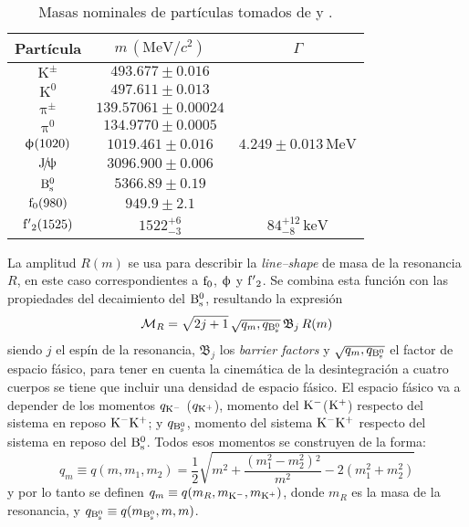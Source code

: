\begin{table}[H]
  \centering
  \begin{tabular}{ccc}
\toprule
Partícula & $m \, (\text{MeV}/c^2)$  & $\Gamma$ \\ \midrule
$\mathrm{K^{\pm}}$    & $ 493.677\pm0.016 $\\
$\mathrm{K^{0}}$      & $497.611\pm0.013$\\
$\uppi^{\pm}$         & $139.57061\pm0.00024$\\
$\uppi^{0}$           & $134.9770\pm0.0005$\\
$\upphi (1020)$         & $1019.461\pm0.016$  & $4.249\pm0.013 \, \text{MeV}$\\
$\mathrm{J}\!/\!\uppsi$               & $3096.900\pm0.006$  \\%
$\mathrm{B}{}_{\mathrm{s}}^{0}$                 & $5366.89\pm0.19$ \\ \midrule
$\mathrm{f}_0 (980)$        & $949.9\pm2.1$ \\
$\mathrm{f'}_2 (1525)$       & $1522_{-3}^{+6}$          & $84_{-8}^{+12} \, \text{keV}$\\
\bottomrule
  \end{tabular}
  \caption{Masas nominales de partículas tomados de \cite[primer bloque]{pdg2018} y \cite[segundo bloque]{Aaij:1664567}.} \label{tab_massPDG}
\end{table}
\color{norm}


\color{new}
La amplitud $R(m)$ se usa para describir la \emph{line--shape} de masa de la resonancia $R$, en este caso correspondientes a $\mathrm{f}_0$, $\upphi$ y $\mathrm{f'}_2$. Se combina esta función con las propiedades del decaimiento del $\mathrm{B}{}_{\mathrm{s}}^{0}$, resultando la expresión \cite{Aaij:1664567}  
\begin{equation}
  \mathcal{M}_R = \sqrt{2 j + 1}\, \sqrt{q_m,q_{\mathrm{B}{}_{\mathrm{s}}^{0}}} \,\mathfrak{B}_j \, R(m) \label{eq:masslineshape}
\end{equation}
siendo $j$ el espín de la resonancia, $\mathfrak{B}_j$ los \emph{barrier factors} y  $\sqrt{q_m,q_{\mathrm{B}{}_{\mathrm{s}}^{0}}}$ el factor de espacio fásico, para tener en cuenta la cinemática de la desintegración a cuatro cuerpos se tiene que incluir una densidad de espacio fásico.
%
%
%
%
%
\color{norm}
%
El espacio fásico va a depender de los momentos $q_{\mathrm{K}{}^{-}}$  ($q_{\mathrm{K}{}^{+}}$), momento del $\mathrm{K}{}^{-}$($\mathrm{K}{}^{+}$) respecto del sistema en reposo $\mathrm{K}{}^{-}\mathrm{K}{}^{+}$; y  $q_{\mathrm{B}{}_{\mathrm{s}}^{0}}$, momento del sistema $\mathrm{K}{}^{-}\mathrm{K}{}^{+}$ respecto del sistema en reposo del $\mathrm{B}{}_{\mathrm{s}}^{0}$. Todos esos momentos se construyen de la forma:
\begin{equation}
q_m \equiv q(m,m_1,m_2) = \frac{1}{2}  \sqrt{m^2+\frac{\left(m_1^2-m_2^2\right){}^2}{m^2}-2 \left(m_1^2+m_2^2\right)}	
\end{equation}
y por lo tanto se definen $q_m \equiv q(m_R,m_{\mathrm{K}{}^{-}},m_{\mathrm{K}{}^{+}})$, donde $m_R$ es la masa de la resonancia, y $q_{\mathrm{B}{}_{\mathrm{s}}^{0}} \equiv q(m_{\mathrm{B}{}_{\mathrm{s}}^{0}},m,m)$.



